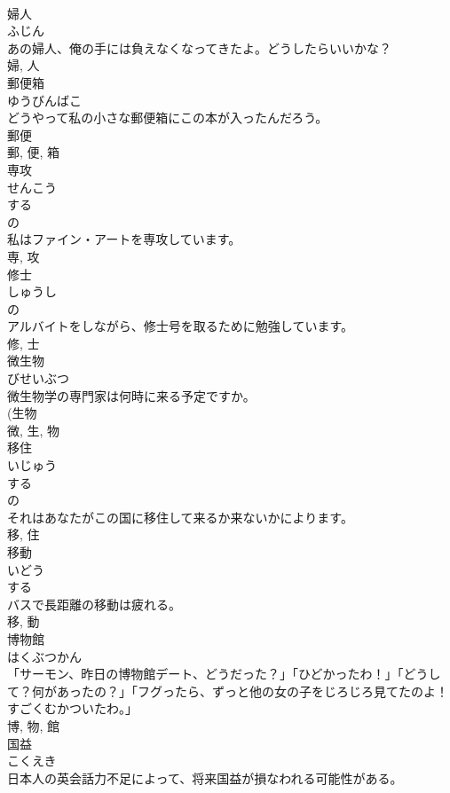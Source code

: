 \documentclass[8pt]{extreport}
\begin{document}
\begin{CJK}{UTF8}{min}
\\	婦人	
\\	ふじん	
\\	あの婦人、俺の手には負えなくなってきたよ。どうしたらいいかな？	
\\	婦, 人	
\\	郵便箱	
\\	ゆうびんばこ	
\\	どうやって私の小さな郵便箱にこの本が入ったんだろう。	
\\	郵便 
\\	郵, 便, 箱	
\\	専攻	
\\	せんこう	
\\	する 
\\	の 
\\	私はファイン・アートを専攻しています。	
\\	専, 攻	
\\	修士	
\\	しゅうし	
\\	の 
\\	アルバイトをしながら、修士号を取るために勉強しています。	
\\	修, 士	
\\	微生物	
\\	びせいぶつ	
\\	微生物学の専門家は何時に来る予定ですか。	
\\	(生物 
\\	微, 生, 物	
\\	移住	
\\	いじゅう	
\\	する 
\\	の 
\\	それはあなたがこの国に移住して来るか来ないかによります。	
\\	移, 住	
\\	移動	
\\	いどう	
\\	する 
\\	バスで長距離の移動は疲れる。	
\\	移, 動	
\\	博物館	
\\	はくぶつかん	
\\	「サーモン、昨日の博物館デート、どうだった？」「ひどかったわ！」「どうして？何があったの？」「フグったら、ずっと他の女の子をじろじろ見てたのよ！すごくむかついたわ。」	
\\	博, 物, 館	
\\	国益	
\\	こくえき	
\\	日本人の英会話力不足によって、将来国益が損なわれる可能性がある。	

\end{CJK}
\end{document}
